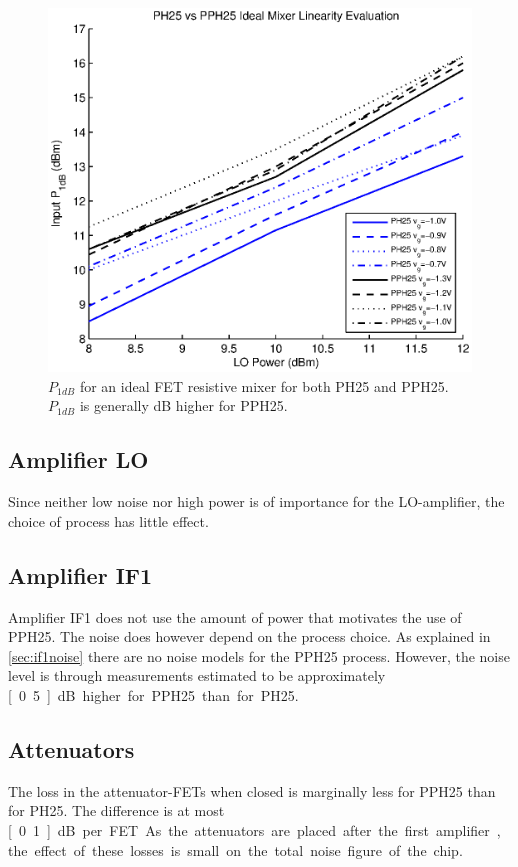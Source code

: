 			\begin{figure}[hbt!]
				\centering
				\includegraphics[width=1.0\textwidth]{fig/process/ph25vspph25}
				\caption[$P_{1dB}$ for an ideal FET resistive mixer for both PH25 and PPH25.]{$P_{1dB}$ for an ideal FET resistive mixer for both PH25 and PPH25. $P_{1dB}$ is generally \unit[1]{dB} higher for PPH25.}\label{fig:ph25vspph25}
			\end{figure}

		\subsection{Amplifier LO}
			Since neither low noise nor high power is of importance for the LO-amplifier, the choice of process has little effect.

		\subsection{Amplifier IF1}
			Amplifier IF1 does not use the amount of power that motivates the use of PPH25. The noise does however depend on the process choice. As explained in \autoref{sec:if1noise} there are no noise models for the PPH25 process. However, the noise level is through measurements estimated to be approximately \unit[0.5]{dB} higher for PPH25 than for PH25.

		\subsection{Attenuators}
			The loss in the attenuator-FETs when closed is marginally less for PPH25 than for PH25. The difference is at most \unit[0.1]{dB} per FET. As the attenuators are placed after the first amplifier, the effect of these losses is small on the total noise figure of the chip.

